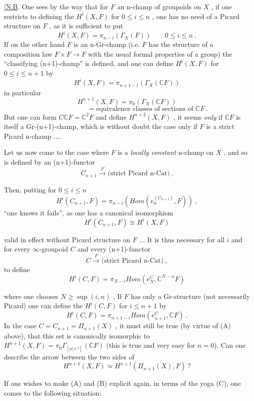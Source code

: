 \documentclass[11pt]{article}
\newcommand{\uline}[1]{\underline{#1}}
\newcommand{\unsure}[1]{[#1?]}
\begin{document}
[\uline{N.B}. One sees by the way that for $F$ an n-champ of groupoids on $X$ ,
if one restricts to defining the $H^i(X, F)$ for $0 \leq i \leq n$ , one has no need
of a Picard structure on $F$ , as it is sufficient to put
\[ H^i(X, F) = \pi_{n-i}(\Gamma_X(F)) \qquad 0 \leq i \leq n \ . \]
If on the other hand $F$ is an n-Gr-champ (i.e. $F$ has the structure of a
composition law $F \times F \rightarrow F$ with the usual formal properties of a group) the
``classifying (n+1)-champ'' is defined, and one can define $H^i(X, F)$ for
$0 \leq i \leq n + 1$ by
\[ H^i(X, F) = \pi_{n+1-i}(\Gamma_X(\mathbb{C}F)) \]
in particular
\[ H^{n+1}(X, F) = \pi_0(\Gamma_X(\mathbb{C}F)) \]
\[ \hspace{6em} = \text{equivalence classes of sections of } \mathbb{C}F \ . \]
But one can form $C\mathbb{C}F = \mathbb{C}^2F$ and define $H^{n+2}(X, F)$ , it seems \textit{only} if $\mathbb{C}F$
is itself a Gr-(n+1)-champ, which is without doubt the case only if $F$ is
a strict Picard n-champ ....

Let us now come to the case where $F$ is a \textit{locally constant} n-champ on
$X$ , and so is defined by an (n+1)-functor
\[ C_{n+1} \xrightarrow{F} \text{(strict Picard n-Cat)} \ . \]

Then, putting for $0 \leq i \leq n$
\[ H^i(C_{n+1}, F) = \pi_{n-i}(\mathit{Hom}(e_n^{(C_{n+1})}, F)) \ , \]
``one knows it fails'', as one has a canonical isomorphism
\[ H^i(C_{n+1}, F) \cong H^i(X, F) \]

valid in effect without Picard structure on $F$ ... It is thus necessary
for all $i$ and for every $\infty$-groupoid $C$ and every (n+1)-functor
\[ C \xrightarrow{F} \text{(strict Picard n-Cat)} \ , \]
to define
\[ H^i(C, F) = \pi_{N-i}\mathit{Hom}(e_N^C, \mathbb{C}^{N-n}F) \]

where one chooses $N \geq \sup(i, n)$ , If $F$ has only a Gr-structure (not
necessarily Picard) one can define the $H^i(C, F)$ for $i \leq n + 1$ by
\[ H^i(C, F) = \pi_{n+1-i}\mathit{Hom}(e^C_{n+1}, \mathbb{C}F) \ . \]
In the case $C = C_{n+1} = \Pi_{n+1}(X)$ , it must still be true (by virtue of (A)
above), that this set is canonically isomorphic to $H^{n+1}(X, F) = \pi_0\Gamma_{\unsure{x|\times}}(\mathbb{C}F)$
(this is true and very easy for $n = 0$). Can one describe the arrow
between the two sides of
\[ H^{n+1}(X, F) \simeq H^{n+1}(\Pi_{n+1}(X), F) \ ? \]

If one wishes to make (A) and (B) explicit again, in terms of the yoga
(C), one comes to the following situation:
\end{document}
